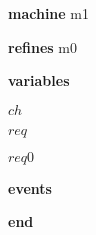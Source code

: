 \begin{block}
  \item   \textbf{machine} m1
  \item   \textbf{refines} m0
  \item   \textbf{variables}
  \begin{block}
    \item   $ch$
    \item   $req$
    \item   $req0$
  \end{block}
  \item   \textbf{events}
  \begin{block}
    \item   
    \item   
  \end{block}
  \item   \textbf{end} \\
\end{block}
